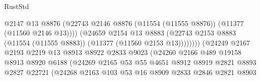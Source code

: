 \begin{lexlean}{RustStd}
\begin{coremodule}
                                            @2147
                                            @13
                                            @8876
                                            (@22743
                                              @2146
                                              @8876
                                              (@11554 (@11555 @8876))
                                              (@11377 (@11560 @2146 @13))))
                                          (@24659
                                            @2154
                                            @13
                                            @8883
                                            (@22743
                                              @2153
                                              @8883
                                              (@11554 (@11555 @8883))
                                              (@11377 (@11560 @2153 @13))))))))
                                  (@24249
                                    @2167
                                    @2193
                                    @2219
                                    @13
                                    @8913
                                    @8922
                                    @2833
                                    @9023
                                    (@24260
                                      @2166
                                      @489
                                      @19158
                                      @8913
                                      @8920
                                      @6188
                                      (@24269
                                        @2165
                                        @53
                                        @55
                                        @4651
                                        @8912
                                        @8919
                                        @2821
                                        @8893
                                        @2827
                                        @22721
                                        (@24268
                                          @2163
                                          @103
                                          @53
                                          @16
                                          @8909
                                          @2833
                                          @2846
                                          @2821
                                          @8903

\end{coremodule}
\end{lexlean}
